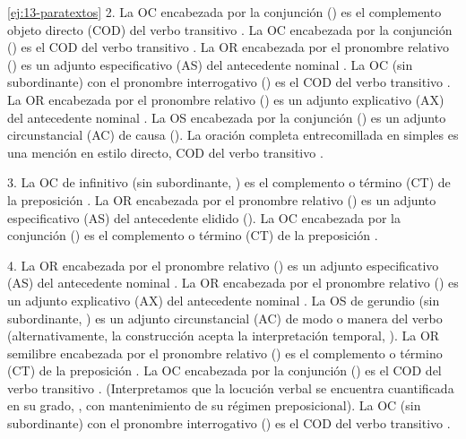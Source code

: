 \begin{solucion}{\ref{ej:13-paratextos}}
2. La OC encabezada por la conjunción  () es el complemento objeto directo (COD) del verbo transitivo
. La OC encabezada por la conjunción  () es el COD del verbo transitivo . La OR encabezada
por el pronombre relativo  () es un adjunto especificativo (AS) del antecedente nominal
. La OC (sin subordinante) con el pronombre interrogativo
 ()
es el COD del verbo transitivo . La OR encabezada por el
pronombre relativo  () es un
adjunto explicativo (AX) del antecedente nominal . La OS
encabezada por la conjunción  () es un adjunto
circunstancial (AC) de causa ().
La oración completa entrecomillada en simples es una mención en estilo directo,
COD del verbo transitivo .

3. La OC de infinitivo (sin subordinante, ) es
el complemento o término (CT) de la preposición . La OR encabezada
por el pronombre relativo  () es un adjunto especificativo (AS) del antecedente elidido
 (). La OC encabezada por la
conjunción  () es el complemento o término (CT) de la preposición
.

4. La OR encabezada por el pronombre relativo  () es un adjunto especificativo (AS) del
antecedente nominal . La OR encabezada por el pronombre relativo
 () es un adjunto
explicativo (AX) del antecedente nominal . La OS de gerundio (sin
subordinante, ) es un adjunto
circunstancial (AC) de modo o manera del verbo 
(alternativamente, la construcción acepta la interpretación temporal, ). La OR semilibre encabezada por el pronombre
relativo  () es el
complemento o término (CT) de la preposición . La OC encabezada
por la conjunción  () es el COD del verbo transitivo . (Interpretamos que la
locución verbal  se encuentra cuantificada en su grado,
, con mantenimiento de
su régimen preposicional). La OC (sin subordinante) con el pronombre
interrogativo  () es el COD del
verbo transitivo .


\end{solucion}
